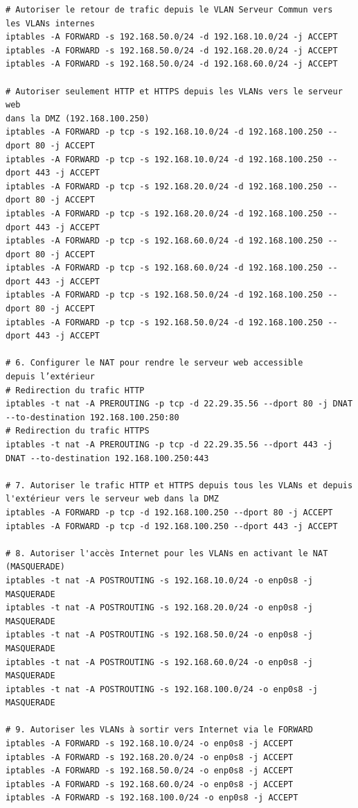 \documentclass[a4paper,12pt,openany]{report}
\begin{document}
\begin{appendices}
\begin{verbatim}
# Autoriser le retour de trafic depuis le VLAN Serveur Commun vers
les VLANs internes
iptables -A FORWARD -s 192.168.50.0/24 -d 192.168.10.0/24 -j ACCEPT
iptables -A FORWARD -s 192.168.50.0/24 -d 192.168.20.0/24 -j ACCEPT
iptables -A FORWARD -s 192.168.50.0/24 -d 192.168.60.0/24 -j ACCEPT

# Autoriser seulement HTTP et HTTPS depuis les VLANs vers le serveur web
dans la DMZ (192.168.100.250)
iptables -A FORWARD -p tcp -s 192.168.10.0/24 -d 192.168.100.250 --dport 80 -j ACCEPT
iptables -A FORWARD -p tcp -s 192.168.10.0/24 -d 192.168.100.250 --dport 443 -j ACCEPT
iptables -A FORWARD -p tcp -s 192.168.20.0/24 -d 192.168.100.250 --dport 80 -j ACCEPT
iptables -A FORWARD -p tcp -s 192.168.20.0/24 -d 192.168.100.250 --dport 443 -j ACCEPT
iptables -A FORWARD -p tcp -s 192.168.60.0/24 -d 192.168.100.250 --dport 80 -j ACCEPT
iptables -A FORWARD -p tcp -s 192.168.60.0/24 -d 192.168.100.250 --dport 443 -j ACCEPT
iptables -A FORWARD -p tcp -s 192.168.50.0/24 -d 192.168.100.250 --dport 80 -j ACCEPT
iptables -A FORWARD -p tcp -s 192.168.50.0/24 -d 192.168.100.250 --dport 443 -j ACCEPT

# 6. Configurer le NAT pour rendre le serveur web accessible 
depuis l’extérieur
# Redirection du trafic HTTP
iptables -t nat -A PREROUTING -p tcp -d 22.29.35.56 --dport 80 -j DNAT --to-destination 192.168.100.250:80
# Redirection du trafic HTTPS
iptables -t nat -A PREROUTING -p tcp -d 22.29.35.56 --dport 443 -j DNAT --to-destination 192.168.100.250:443

# 7. Autoriser le trafic HTTP et HTTPS depuis tous les VLANs et depuis 
l'extérieur vers le serveur web dans la DMZ
iptables -A FORWARD -p tcp -d 192.168.100.250 --dport 80 -j ACCEPT
iptables -A FORWARD -p tcp -d 192.168.100.250 --dport 443 -j ACCEPT

# 8. Autoriser l'accès Internet pour les VLANs en activant le NAT (MASQUERADE)
iptables -t nat -A POSTROUTING -s 192.168.10.0/24 -o enp0s8 -j MASQUERADE 
iptables -t nat -A POSTROUTING -s 192.168.20.0/24 -o enp0s8 -j MASQUERADE 
iptables -t nat -A POSTROUTING -s 192.168.50.0/24 -o enp0s8 -j MASQUERADE 
iptables -t nat -A POSTROUTING -s 192.168.60.0/24 -o enp0s8 -j MASQUERADE 
iptables -t nat -A POSTROUTING -s 192.168.100.0/24 -o enp0s8 -j MASQUERADE 

# 9. Autoriser les VLANs à sortir vers Internet via le FORWARD 
iptables -A FORWARD -s 192.168.10.0/24 -o enp0s8 -j ACCEPT 
iptables -A FORWARD -s 192.168.20.0/24 -o enp0s8 -j ACCEPT 
iptables -A FORWARD -s 192.168.50.0/24 -o enp0s8 -j ACCEPT 
iptables -A FORWARD -s 192.168.60.0/24 -o enp0s8 -j ACCEPT 
iptables -A FORWARD -s 192.168.100.0/24 -o enp0s8 -j ACCEPT
            \end{verbatim}

\end{appendices}
\end{document}
